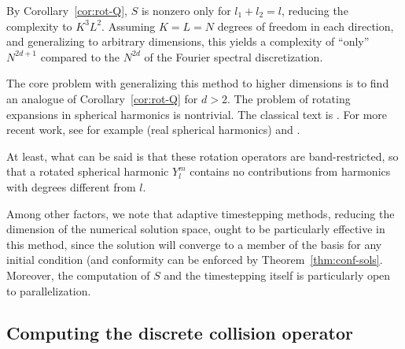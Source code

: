 By Corollary~\ref{cor:rot-Q}, $S$ is nonzero only for $l_1+l_2=l$, reducing the complexity to $K^3L^2$.
Assuming $K=L=N$ degrees of freedom in each direction, and generalizing to arbitrary dimensions, this yields a
complexity of ``only'' $N^{2d+1}$ compared to the $N^{2d}$ of the Fourier spectral discretization.
\begin{remark} \label{rem:rot-pol}
The core problem with generalizing this method to higher dimensions is to find an analogue of
Corollary~\ref{cor:rot-Q} for $d>2$. The problem of rotating expansions in spherical harmonics is nontrivial.
The classical text is \cite{Wigner31}. For more recent work, see for example \cite{Ivanic96} (real spherical
harmonics) and \cite{Lessig12}.

At least, what can be said is that these rotation operators are band-restricted, so that a rotated spherical
harmonic $Y_l^m$ contains no contributions from harmonics with degrees different from $l$.
\end{remark}

Among other factors, we note that adaptive timestepping methods, reducing the dimension of the numerical
solution space, ought to be particularly effective in this method, since the solution will converge to a
member of the basis for any initial condition (and conformity can be enforced by Theorem~\ref{thm:conf-sols}.
Moreover, the computation of $S$ and the timestepping itself is particularly open to parallelization.

\subsection{Computing the discrete collision operator}

